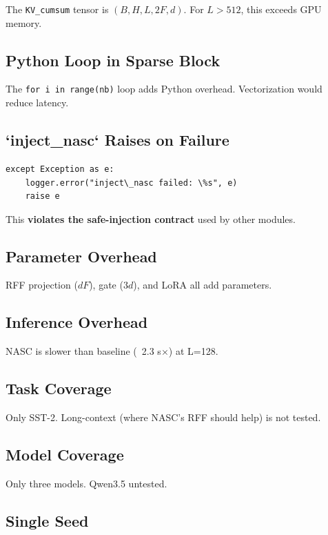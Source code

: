 The \texttt{KV\_cumsum} tensor is $(B, H, L, 2F, d)$. For $L > 512$, this exceeds 
GPU memory.

\subsection{Python Loop in Sparse Block}

The \texttt{for i in range(nb)} loop adds Python overhead. Vectorization would 
reduce latency.

\subsection{`inject\_nasc` Raises on Failure}

\begin{lstlisting}
except Exception as e:
    logger.error("inject\_nasc failed: \%s", e)
    raise e
\end{lstlisting}

This \textbf{violates the safe-injection contract} used by other modules.

\subsection{Parameter Overhead}

RFF projection ($dF$), gate ($3d$), and LoRA all add parameters.

\subsection{Inference Overhead}

NASC is slower than baseline (~2.3 s$\times$) at L=128.

\subsection{Task Coverage}

Only SST-2. Long-context (where NASC's RFF should help) is not tested.

\subsection{Model Coverage}

Only three models. Qwen3.5 untested.

\subsection{Single Seed}

